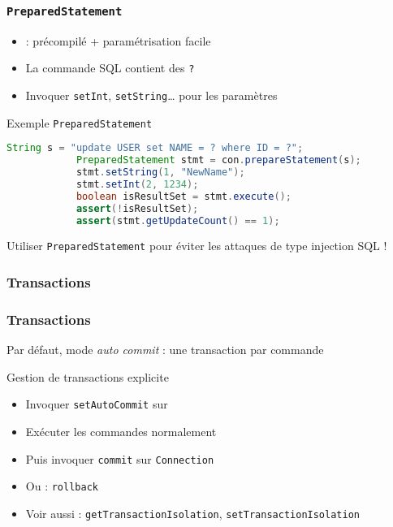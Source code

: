 \documentclass[english, french]{beamer}
\begin{document}
\begin{frame}[fragile]
	\frametitle{\texttt{PreparedStatement}}
	\begin{itemize}
		\item {} : précompilé + paramétrisation facile
		\item La commande SQL contient des \texttt{?}
		\item Invoquer \texttt{setInt}, \texttt{setString}… pour les paramètres
	\end{itemize}
	\begin{exampleblock}{Exemple \texttt{PreparedStatement}}
		\begin{lstlisting}[keywordstyle=\fontspec{Latin Modern Mono Light}\textbf, emph={String, PreparedStatement}, emphstyle=\fontspec{Latin Modern Mono Light}\textbf, language=Java, basicstyle=\small\NoAutoSpacing\ttfamily, aboveskip=0pt, belowskip=0pt, showstringspaces=false]
			String s = "update USER set NAME = ? where ID = ?";
			PreparedStatement stmt = con.prepareStatement(s);
			stmt.setString(1, "NewName");
			stmt.setInt(2, 1234);
			boolean isResultSet = stmt.execute();
			assert(!isResultSet);
			assert(stmt.getUpdateCount() == 1);
		\end{lstlisting}
	\end{exampleblock}
	Utiliser \texttt{PreparedStatement} pour éviter les attaques de type injection SQL !
\end{frame}

\subsubsection{Transactions}
\begin{frame}
	\frametitle{Transactions}
	Par défaut, mode \emph{auto commit} : une transaction par commande
	\begin{block}{Gestion de transactions explicite}
		\begin{itemize}
			\item Invoquer \texttt{setAutoCommit} sur 
			\item Exécuter les commandes normalement
			\item Puis invoquer \texttt{commit} sur \texttt{Connection}
			\item Ou : \texttt{rollback}
			\item Voir aussi : \texttt{getTransactionIsolation}, \texttt{setTransactionIsolation}
		\end{itemize}
	\end{block}
\end{frame}
\end{document}
